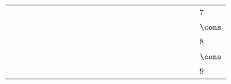 {\begin{tabular}{ccccccccccccccccccccccc|l}
\gcell{$$} & \gcell{$\posC{\circ}$} & \gcell{$\posC{\circ}$} & \gcell{$\posC{\circ}$} & \gcell{$\posC{\circ}$} & \gcell{$\posD{\bullet}$} & \gcell{$\posC{\circ}$} & \gcell{$$} & \gcell{$$} & \gcell{$$} & \gcell{$\posC{\circ}$} & \gcell{$\posC{\circ}$} & \gcell{$\posC{\circ}$} & \gcell{$\posC{\circ}$} & \gcell{$\posC{\circ}$} & \gcell{$\posC{\circ}$} & \gcell{$\posC{\circ}$} & \gcell{$\posC{\circ}$} & \gcell{$\posC{\circ}$} & \gcell{$\posC{\circ}$} & \gcell{$\posC{\circ}$} & \gcell{$$} & \gcell{$$} & $7$ \\
\gcell{$$} & \gcell{$\posC{\circ}$} & \gcell{$\posC{\circ}$} & \gcell{$\posC{\circ}$} & \gcell{$\posC{\circ}$} & \gcell{$\posC{\circ}$} & \gcell{$\posC{\circ}$} & \gcell{$$} & \gcell{$$} & \gcell{$$} & \gcell{$\posC{\circ}$} & \gcell{$\posC{\circ}$} & \gcell{$\posC{\circ}$} & \gcell{$\posC{\circ}$} & \gcell{$\posC{\circ}$} & \gcell{$\posC{\circ}$} & \gcell{$\posC{\circ}$} & \gcell{$\posC{\circ}$} & \gcell{$\posC{\circ}$} & \gcell{$\posC{\circ}$} & \gcell{$\posC{\circ}$} & \gcell{$$} & \gcell{$$} & $\cons$ \\
\gcell{$$} & \gcell{$\posC{\circ}$} & \gcell{$\posC{\circ}$} & \gcell{$\posC{\circ}$} & \gcell{$\posC{\circ}$} & \gcell{$\posC{\circ}$} & \gcell{$\posC{\circ}$} & \gcell{$\posD{\bullet}$} & \gcell{$\posC{\circ}$} & \gcell{$$} & \gcell{$\posC{\circ}$} & \gcell{$\posC{\circ}$} & \gcell{$\posC{\circ}$} & \gcell{$\posC{\circ}$} & \gcell{$\posC{\circ}$} & \gcell{$\posC{\circ}$} & \gcell{$\posC{\circ}$} & \gcell{$\posC{\circ}$} & \gcell{$\posC{\circ}$} & \gcell{$\posC{\circ}$} & \gcell{$\posC{\circ}$} & \gcell{$$} & \gcell{$$} & $8$ \\
\gcell{$$} & \gcell{$\posC{\circ}$} & \gcell{$\posC{\circ}$} & \gcell{$\posC{\circ}$} & \gcell{$\posC{\circ}$} & \gcell{$\posC{\circ}$} & \gcell{$\posC{\circ}$} & \gcell{$\posC{\circ}$} & \gcell{$\posC{\circ}$} & \gcell{$$} & \gcell{$\posC{\circ}$} & \gcell{$\posC{\circ}$} & \gcell{$\posC{\circ}$} & \gcell{$\posC{\circ}$} & \gcell{$\posC{\circ}$} & \gcell{$\posC{\circ}$} & \gcell{$\posC{\circ}$} & \gcell{$\posC{\circ}$} & \gcell{$\posC{\circ}$} & \gcell{$\posC{\circ}$} & \gcell{$\posC{\circ}$} & \gcell{$$} & \gcell{$$} & $\cons$ \\
\gcell{$$} & \gcell{$\posC{\circ}$} & \gcell{$\posC{\circ}$} & \gcell{$\posC{\circ}$} & \gcell{$\posC{\circ}$} & \gcell{$\posC{\circ}$} & \gcell{$\posC{\circ}$} & \gcell{$\posC{\circ}$} & \gcell{$\posC{\circ}$} & \gcell{$\posC{\circ}$} & \gcell{$\posC{\circ}$} & \gcell{$\posC{\circ}$} & \gcell{$\posC{\circ}$} & \gcell{$\posC{\circ}$} & \gcell{$\posC{\circ}$} & \gcell{$\posC{\circ}$} & \gcell{$\posC{\circ}$} & \gcell{$\posC{\circ}$} & \gcell{$\posC{\circ}$} & \gcell{$\posD{\bullet}$} & \gcell{$\posC{\circ}$} & \gcell{$$} & \gcell{$$} & $9$ \\

\end{tabular}}

